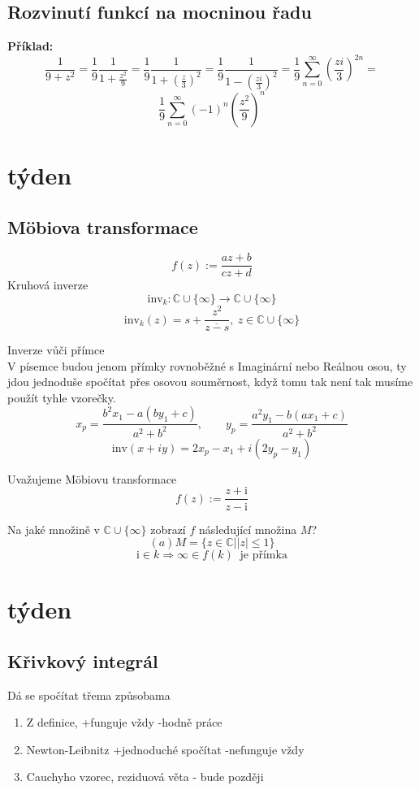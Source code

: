 \documentclass{article}
\newcommand{\mi}{\mathrm{i}}
\newcommand{\inv}{\mathrm{inv}}
\begin{document}
        \subsection{Rozvinutí funkcí na mocninou řadu}
            {\bf Příklad:}
            \[\frac{1}{9+z^2}=\frac{1}{9}\frac{1}{1+\frac{z^2}{9}}=
            \frac{1}{9}\frac{1}{1+\left(\frac{z}{3}\right)^2}=
            \frac{1}{9}\frac{1}{1-\left(\frac{zi}{3}\right)^2}=
            \frac{1}{9}\sum_{n=0}^{\infty}\left(\frac{zi}{3}\right)^{2n}=\]
            \[\frac{1}{9}\sum_{n=0}^{\infty}(-1)^n\left(\frac{z^2}{9}\right)^{n}\]
    \section{týden}
        \subsection{M\"{o}biova transformace}
        \[f(z):=\frac{az+b}{cz+d}\]
        Kruhová inverze
        \[\inv_k:\mathbb{C}\cup\{\infty\}\to\mathbb{C}\cup\{\infty\}\]
        \[\inv_k(z)=s+\frac{z^2}{\overline{z-s}},\:z\in\mathbb{C}\cup\{\infty\}\]

        Inverze vůči přímce\\
        V písemce budou jenom přímky rovnoběžné s Imaginární nebo Reálnou osou,
        ty jdou jednoduše spočítat přes osovou souměrnost, když tomu tak není tak 
        musíme použít tyhle vzorečky.
        \[x_p=\frac{b^2x_1-a(by_1+c)}{a^2+b^2},\qquad 
        y_p=\frac{a^2y_1-b(ax_1+c)}{a^2+b^2}\]
        \[\inv(x+iy)=2x_p-x_1+i(2y_p-y_1)\]

        Uvažujeme M\"{o}biovu transformace
        \[f(z):=\frac{z+\mi}{z-\mi}\]

        Na jaké množině v $\mathbb{C}\cup\{\infty\}$ zobrazí $f$ následující množina $M$?
        \[(a)M=\{z\in\mathbb{C}||z|\leq 1\}\]
        \[\mi\in k\Rightarrow\infty\in f(k)\: \mbox{ je přímka}\]
    \section{týden}
        \subsection{Křivkový integrál}
        Dá se spočítat třema způsobama
        \begin{enumerate}
            \item Z definice, +funguje vždy -hodně práce
            \item Newton-Leibnitz +jednoduché spočítat -nefunguje vždy
            \item Cauchyho vzorec, reziduová věta - bude později
        \end{enumerate}
\end{document}

